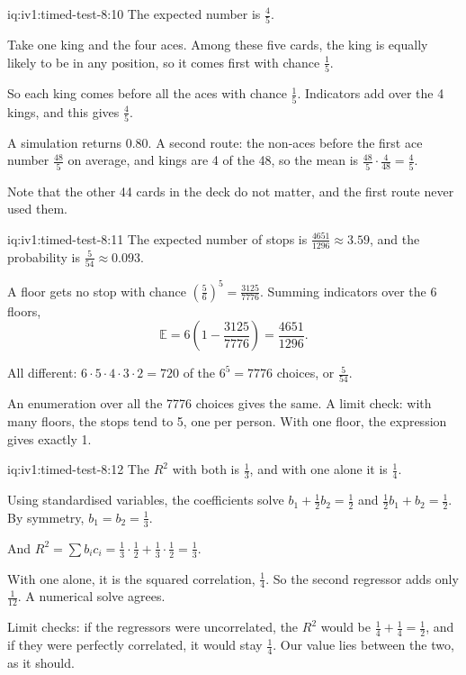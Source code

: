 \begin{solution}{iq:iv1:timed-test-8:10}
The expected number is $\frac45$.

Take one king and the four aces. Among these five cards, the king is equally likely to be in any position, so it comes first with chance $\frac15$.

So each king comes before all the aces with chance $\frac15$. Indicators add over the 4 kings, and this gives $\frac45$.

A simulation returns $0.80$. A second route: the non-aces before the first ace number $\frac{48}{5}$ on average, and kings are 4 of the 48, so the mean is $\frac{48}{5} \cdot \frac{4}{48} = \frac45$.

Note that the other 44 cards in the deck do not matter, and the first route never used them.

\end{solution}

\begin{solution}{iq:iv1:timed-test-8:11}
The expected number of stops is $\frac{4651}{1296} \approx 3.59$, and the probability is $\frac{5}{54} \approx 0.093$.

A floor gets no stop with chance $(\frac56)^5 = \frac{3125}{7776}$. Summing indicators over the 6 floors,
\[
\mathbb{E} = 6\left(1 - \frac{3125}{7776}\right) = \frac{4651}{1296}.
\]

All different: $6 \cdot 5 \cdot 4 \cdot 3 \cdot 2 = 720$ of the $6^5 = 7776$ choices, or $\frac{5}{54}$.

An enumeration over all the 7776 choices gives the same. A limit check: with many floors, the stops tend to 5, one per person. With one floor, the expression gives exactly 1.

\end{solution}

\begin{solution}{iq:iv1:timed-test-8:12}
The $R^2$ with both is $\frac13$, and with one alone it is $\frac14$.

Using standardised variables, the coefficients solve $b_1 + \frac12b_2 = \frac12$ and $\frac12b_1 + b_2 = \frac12$. By symmetry, $b_1 = b_2 = \frac13$.

And $R^2 = \sum b_ic_i = \frac13 \cdot \frac12 + \frac13 \cdot \frac12 = \frac13$.

With one alone, it is the squared correlation, $\frac14$. So the second regressor adds only $\frac{1}{12}$. A numerical solve agrees.

Limit checks: if the regressors were uncorrelated, the $R^2$ would be $\frac14 + \frac14 = \frac12$, and if they were perfectly correlated, it would stay $\frac14$. Our value lies between the two, as it should.

\end{solution}
